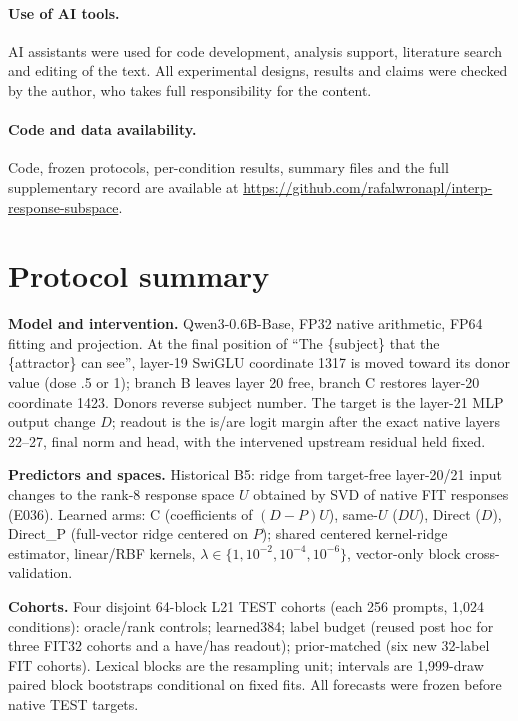 \documentclass[11pt]{article}
\begin{document}
\paragraph{Use of AI tools.} AI assistants were used for code development, analysis support, literature search and editing of the text. All experimental designs, results and claims were checked by the author, who takes full responsibility for the content.

\paragraph{Code and data availability.} Code, frozen protocols, per-condition results, summary files and the full supplementary record are available at \url{https://github.com/rafalwronapl/interp-response-subspace}.

\clearpage
\small


\appendix
\section{Protocol summary}\label{app:protocol}
\textbf{Model and intervention.} Qwen3-0.6B-Base, FP32 native arithmetic, FP64 fitting and projection. At the final position of ``The \{subject\} that the \{attractor\} can see'', layer-19 SwiGLU coordinate 1317 is moved toward its donor value (dose .5 or 1); branch B leaves layer 20 free, branch C restores layer-20 coordinate 1423. Donors reverse subject number. The target is the layer-21 MLP output change $D$; readout is the is/are logit margin after the exact native layers 22--27, final norm and head, with the intervened upstream residual held fixed.

\textbf{Predictors and spaces.} Historical B5: ridge from target-free layer-20/21 input changes to the rank-8 response space $U$ obtained by SVD of native FIT responses (E036). Learned arms: C (coefficients of $(D-P)U$), same-$U$ ($DU$), Direct ($D$), Direct\_P (full-vector ridge centered on $P$); shared centered kernel-ridge estimator, linear/RBF kernels, $\lambda\in\{1,10^{-2},10^{-4},10^{-6}\}$, vector-only block cross-validation.

\textbf{Cohorts.} Four disjoint 64-block L21 TEST cohorts (each 256 prompts, 1,024 conditions): oracle/rank controls; learned384; label budget (reused post hoc for three FIT32 cohorts and a have/has readout); prior-matched (six new 32-label FIT cohorts). Lexical blocks are the resampling unit; intervals are 1,999-draw paired block bootstraps conditional on fixed fits. All forecasts were frozen before native TEST targets.
\end{document}
